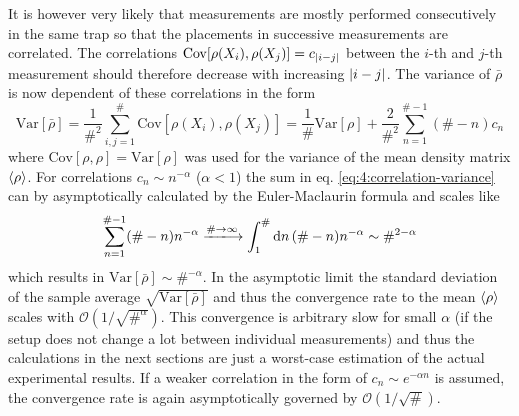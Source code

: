 It is however very likely that measurements are mostly performed consecutively in the same trap so that the placements in successive measurements are correlated.
The correlations $\mathrm{Cov}[\rho(X_i), \rho(X_j)] = c_{\left\lvert i-j\right\rvert}$ between the $i$-th and $j$-th measurement should therefore decrease with increasing $\left\lvert i-j\right\rvert$.
The variance of $\bar{\rho}$ is now dependent of these correlations in the form \cite[p. 1227]{Riley_2018}
\begin{equation}\label{eq:4:correlation-variance}
  \mathrm{Var}[\bar{\rho}] = \frac{1}{\#^2} \sum_{i,j=1}^{\#} \mathrm{Cov}[\rho(X_i), \rho(X_j)] = \frac{1}{\#}\mathrm{Var}[\rho] + \frac{2}{\#^2}\sum_{n=1}^{\# - 1}(\# - n) c_n
\end{equation}
where $\mathrm{Cov}[\rho, \rho] = \mathrm{Var}[\rho]$ was used for the variance of the mean density matrix $\left\langle\rho\right\rangle$.
For correlations $c_n \sim n^{-\alpha}$ ($\alpha < 1$) the sum in eq. \eqref{eq:4:correlation-variance} can by asymptotically calculated by the Euler-Maclaurin formula and scales like
\begin{equation}
  \sum_{n=1}^{\# - 1}(\# - n)n^{-\alpha} \xlongrightarrow{\#\rightarrow\infty} \int_1^{\#}\dd n \, (\#-n)n^{-\alpha} \sim \#^{2-\alpha}
\end{equation}
which results in $\mathrm{Var}[\bar{\rho}] \sim \#^{-\alpha}$. In the asymptotic limit the standard deviation of the sample average $\sqrt{\mathrm{Var}[\bar{\rho}]}$ and thus the convergence rate to the mean $\left\langle\rho\right\rangle$ scales with $\mathcal{O}(1/\sqrt{\#^\alpha})$.
This convergence is arbitrary slow for small $\alpha$ (if the setup does not change a lot between individual measurements) and thus the calculations in the next sections are just a worst-case estimation of the actual experimental results.
If a weaker correlation in the form of $c_n \sim e^{-\alpha n}$ is assumed, the convergence rate is again asymptotically governed by $\mathcal{O}(1/\sqrt{\#})$.









